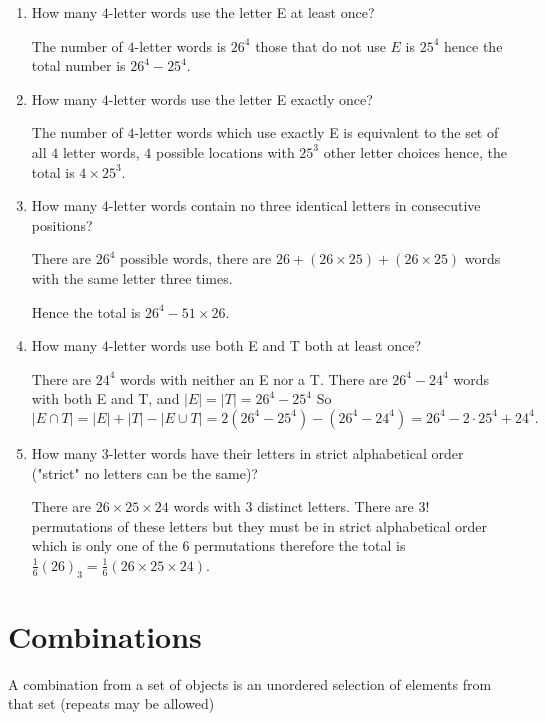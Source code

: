 \documentclass[10pt, a4paper]{article}
\begin{document}
\begin{enumerate}[label = B\arabic*]
    \item How many $4$-letter words use the letter E at least once?
    
    The number of $4$-letter words is $26 ^ 4$ those that do not use $E$ is $25 ^ 4$ hence the total number is $26 ^ 4 - 25 ^ 4$.
    \item How many $4$-letter words use the letter E exactly once?

    The number of $4$-letter words which use exactly E is equivalent to the set of all $4$ letter words, $4$ possible locations with $25 ^ 3$ other letter choices hence, the total is $4 \times 25 ^ 3$.
    
    \item How many $4$-letter words contain no three identical letters in consecutive positions?

    There are $26 ^ 4$ possible words, there are $26 + (26 \times 25) + (26 \times 25)$ words with the same letter three times.

    Hence the total is $26 ^ 4 - 51 \times 26$.
    
    \item How many $4$-letter words use both E and T both at least once?

    There are $24 ^ 4$ words with neither an E nor a T. There are $26 ^ 4 - 24 ^ 4$ words with both E and T, and $|E| = |T| = 26 ^ 4 - 25 ^ 4$ So
    \[
    |E \cap T| = |E| + |T| - |E \cup T| = 2(26 ^ 4 - 25 ^ 4) - (26 ^ 4 - 24 ^ 4) = 26 ^ 4 - 2 \cdot 25 ^ 4 + 24 ^ 4.
    \]
    
    \item How many $3$-letter words have their letters in strict alphabetical order ("strict" no letters can be the same)?

    There are $26 \times 25 \times 24$ words with $3$ distinct letters. There are $3!$ permutations of these letters but they must be in strict alphabetical order which is only one of the $6$ permutations therefore the total is $\frac{1}{6}(26)_3 = \frac{1}{6}(26 \times 25 \times 24)$.
\end{enumerate}

\newpage

\section{Combinations}
A combination from a set of objects is an unordered selection of elements from that set (repeats may be allowed)
\end{document}
